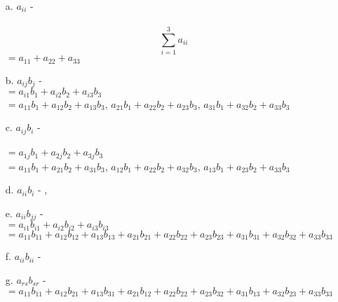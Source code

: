 \documentclass[a4paper,12pt]{article}
\begin{document}
\begin{enumerate}
    \item[a.] $a_{ii}$ - \textbf{}\\
    
     \\
      \[
\sum_{i=1}^{3} a_{ii}
\]
    $=a_{11} + a_{22} + a_{33}$\\
    
    \item[b.] $a_{ij} b_j$ - \textbf {} \\
    $=a_{i1}b_1 + a_{i2}b_2 + a_{i3}b_3$ \\
    $=a_{11}b_1 + a_{12}b_2 + a_{13}b_3$, \quad
    $a_{21}b_1 + a_{22}b_2 + a_{23}b_3$, \quad
    $a_{31}b_1 + a_{32}b_2 + a_{33}b_3$
    
    \item[c.] $a_{ij}b_i$ - \textbf{} \\
    \\
    $=a_{1j}b_1 + a_{2j}b_2 + a_{3j}b_3$ \\
    $=a_{11}b_1 + a_{21}b_2 + a_{31}b_3$, \quad
    $a_{12}b_1 + a_{22}b_2 + a_{32}b_3$, \quad
    $a_{13}b_1 + a_{23}b_2 + a_{33}b_3$\\
    
    \item[d.] $a_{ii}b_i$ - \textbf{},\quad\\ 
    
    \item[e.] $a_{ii}b_{jj}$ - \textbf{}\\
    $=a_{i1}b_{i1} + a_{i2}b_{i2} + a_{i3}b_{i3}$\\
    $=a_{11}b_{11} + a_{12}b_{12} + a_{13}b_{13} + a_{21}b_{21} + a_{22}b_{22} + a_{23}b_{23} + a_{31}b_{31} + a_{32}b_{32} + a_{33}b_{33}$\\
    
    \item[f.] $a_{ii}b_{ii}$ - \textbf{}\\
    
    \item[g.] $a_{rs}b_{sr}$ - \textbf{} \\
    $=a_{11}b_{11} + a_{12}b_{21} + a_{13}b_{31} + a_{21}b_{12} + a_{22}b_{22} + a_{23}b_{32} + a_{31}b_{13} + a_{32}b_{23} + a_{33}b_{33}$\\


\end{enumerate}
\end{document}
